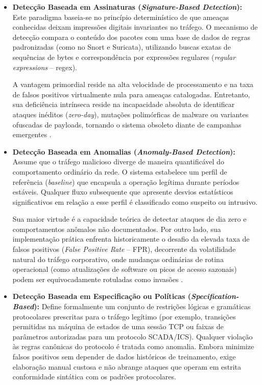 \begin{itemize}
    \item \textbf{Detecção Baseada em Assinaturas (\emph{Signature-Based Detection}):}
    Este paradigma baseia-se no princípio determinístico de que ameaças conhecidas deixam impressões digitais invariantes no tráfego. O mecanismo de detecção compara o conteúdo dos pacotes com uma base de dados de regras padronizadas (como no Snort e Suricata), utilizando buscas exatas de sequências de bytes e correspondência por expressões regulares (\emph{regular expressions} -- regex). 
    
    A vantagem primordial reside na alta velocidade de processamento e na taxa de falsos positivos virtualmente nula para ameaças catalogadas. Entretanto, sua deficiência intrínseca reside na incapacidade absoluta de identificar ataques inéditos (\emph{zero-day}), mutações polimórficas de malware ou variantes ofuscadas de payloads, tornando o sistema obsoleto diante de campanhas emergentes \cite{borgioli2024cae}.

    \item \textbf{Detecção Baseada em Anomalias (\emph{Anomaly-Based Detection}):}
    Assume que o tráfego malicioso diverge de maneira quantificável do comportamento ordinário da rede. O sistema estabelece um perfil de referência (\emph{baseline}) que encapsula a operação legítima durante períodos estáveis. Qualquer fluxo subsequente que apresente desvios estatísticos significativos em relação a esse perfil é classificado como suspeito ou intrusivo. 
    
    Sua maior virtude é a capacidade teórica de detectar ataques de dia zero e comportamentos anômalos não documentados. Por outro lado, sua implementação prática enfrenta historicamente o desafio da elevada taxa de falsos positivos (\emph{False Positive Rate} -- FPR), decorrente da volatilidade natural do tráfego corporativo, onde mudanças ordinárias de rotina operacional (como atualizações de software ou picos de acesso sazonais) podem ser equivocadamente rotuladas como invasões \cite{advancedids2024, hsae2025}.

    \item \textbf{Detecção Baseada em Especificação ou Políticas (\emph{Specification-Based}):}
    Define formalmente um conjunto de restrições lógicas e gramáticas protocolares prescritas para o tráfego legítimo (por exemplo, transições permitidas na máquina de estados de uma sessão TCP ou faixas de parâmetros autorizadas para um protocolo SCADA/ICS). Qualquer violação às regras canônicas do protocolo é tratada como anomalia. Embora minimize falsos positivos sem depender de dados históricos de treinamento, exige elaboração manual custosa e não abrange ataques que operam em estrita conformidade sintática com os padrões protocolares.
\end{itemize}

